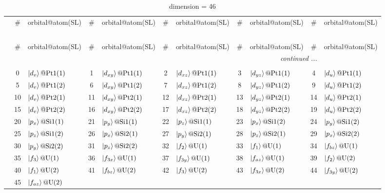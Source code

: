 \documentclass[fleqn,10pt,landscape]{jsarticle}
\begin{document}
\renewcommand{\arraystretch}{1.6}
\begin{longtable}[l]{c|cl|cl|cl|cl|cl}
\captionsetup{justification=raggedright, singlelinecheck=off}
\caption{dimension = 46}
 \\
 \hline \hline
 & \# & orbital@atom(SL) & \# & orbital@atom(SL) & \# & orbital@atom(SL) & \# & orbital@atom(SL) & \# & orbital@atom(SL) \\ \hline \endfirsthead

\multicolumn{10}{l}{\tablename\ \thetable{}} \\
 \hline \hline
 & \# & orbital@atom(SL) & \# & orbital@atom(SL) & \# & orbital@atom(SL) & \# & orbital@atom(SL) & \# & orbital@atom(SL) \\ \hline \endhead

 \hline \hline
\multicolumn{10}{r}{\footnotesize\it continued ...} \\ \endfoot

 \hline \hline
\multicolumn{10}{r}{} \\ \endlastfoot

 & 0 & $\ket{d_{v}}@{\rm Pt1}(1)$ & 1 & $\ket{d_{xy}}@{\rm Pt1}(1)$ & 2 & $\ket{d_{xz}}@{\rm Pt1}(1)$ & 3 & $\ket{d_{yz}}@{\rm Pt1}(1)$ & 4 & $\ket{d_{u}}@{\rm Pt1}(1)$ \\
& 5 & $\ket{d_{v}}@{\rm Pt1}(2)$ & 6 & $\ket{d_{xy}}@{\rm Pt1}(2)$ & 7 & $\ket{d_{xz}}@{\rm Pt1}(2)$ & 8 & $\ket{d_{yz}}@{\rm Pt1}(2)$ & 9 & $\ket{d_{u}}@{\rm Pt1}(2)$ \\
& 10 & $\ket{d_{v}}@{\rm Pt2}(1)$ & 11 & $\ket{d_{xy}}@{\rm Pt2}(1)$ & 12 & $\ket{d_{xz}}@{\rm Pt2}(1)$ & 13 & $\ket{d_{yz}}@{\rm Pt2}(1)$ & 14 & $\ket{d_{u}}@{\rm Pt2}(1)$ \\
& 15 & $\ket{d_{v}}@{\rm Pt2}(2)$ & 16 & $\ket{d_{xy}}@{\rm Pt2}(2)$ & 17 & $\ket{d_{xz}}@{\rm Pt2}(2)$ & 18 & $\ket{d_{yz}}@{\rm Pt2}(2)$ & 19 & $\ket{d_{u}}@{\rm Pt2}(2)$ \\
& 20 & $\ket{p_{x}}@{\rm Si1}(1)$ & 21 & $\ket{p_{y}}@{\rm Si1}(1)$ & 22 & $\ket{p_{z}}@{\rm Si1}(1)$ & 23 & $\ket{p_{x}}@{\rm Si1}(2)$ & 24 & $\ket{p_{y}}@{\rm Si1}(2)$ \\
& 25 & $\ket{p_{z}}@{\rm Si1}(2)$ & 26 & $\ket{p_{x}}@{\rm Si2}(1)$ & 27 & $\ket{p_{y}}@{\rm Si2}(1)$ & 28 & $\ket{p_{z}}@{\rm Si2}(1)$ & 29 & $\ket{p_{x}}@{\rm Si2}(2)$ \\
& 30 & $\ket{p_{y}}@{\rm Si2}(2)$ & 31 & $\ket{p_{z}}@{\rm Si2}(2)$ & 32 & $\ket{f_{2}}@{\rm U}(1)$ & 33 & $\ket{f_{1}}@{\rm U}(1)$ & 34 & $\ket{f_{bz}}@{\rm U}(1)$ \\
& 35 & $\ket{f_{3}}@{\rm U}(1)$ & 36 & $\ket{f_{3x}}@{\rm U}(1)$ & 37 & $\ket{f_{3y}}@{\rm U}(1)$ & 38 & $\ket{f_{az}}@{\rm U}(1)$ & 39 & $\ket{f_{2}}@{\rm U}(2)$ \\
& 40 & $\ket{f_{1}}@{\rm U}(2)$ & 41 & $\ket{f_{bz}}@{\rm U}(2)$ & 42 & $\ket{f_{3}}@{\rm U}(2)$ & 43 & $\ket{f_{3x}}@{\rm U}(2)$ & 44 & $\ket{f_{3y}}@{\rm U}(2)$ \\
& 45 & $\ket{f_{az}}@{\rm U}(2)$ &  &  &  &  &  &  &  &  \\
\end{longtable}
\end{document}
